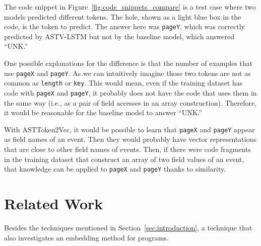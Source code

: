 \documentclass[E]{compsoft}
\begin{document}
The code snippet in Figure~\ref{fig:code_snippets_compare} is a test case where two models predicted different tokens.  The hole, shown as a light blue box in the code, is the token to predict.  The answer here was \texttt{pageY}, which was correctly predicted by ASTV-LSTM but not by the baseline model, which answered ``UNK.''  

One possible explanations for the difference is that the number of examples that use \texttt{pageX} and \texttt{pageY}.  As we can intuitively imagine those two tokens are not as common as \texttt{length} or \texttt{key}.  This would mean, even if the training dataset has code with \texttt{pageX} and \texttt{pageY}, it probably does not have the code that uses them in the same way (i.e., as a pair of field accesses in an array construction).  Therefore, it would be reasonable for the baseline model to answer ``UNK.'' 

With ASTToken2Vec, it would be possible to learn that \texttt{pageX} and \texttt{pageY} appear as field names of an event.  Then they would probably have vector representations that are close to other field names of events.  Then, if there were code fragments in the training dataset that construct an array of two field values of an event, that knowledge can be applied to \texttt{pageX} and \texttt{pageY} thanks to similarity.


\section{Related Work}

Besides the techniques mentioned in Section~\ref{sec:introduction}, a technique that also investigates an embedding method for programs.
\end{document}
